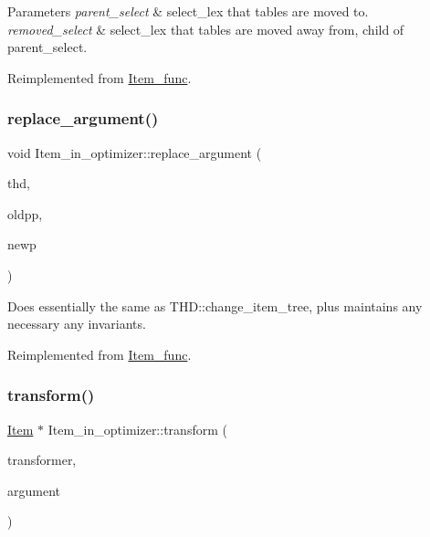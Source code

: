 \begin{DoxyParams}{Parameters}
{\em parent\+\_\+select} & select\+\_\+lex that tables are moved to. \\
\hline
{\em removed\+\_\+select} & select\+\_\+lex that tables are moved away from, child of parent\+\_\+select. \\
\hline
\end{DoxyParams}


Reimplemented from \mbox{\hyperlink{classItem__func_ab2b8cc7a3bf580679718da7e99e3e8d9}{Item\+\_\+func}}.

\mbox{\label{classItem__in__optimizer_a84811ad5fbb554956debfc5acf07faa7}} 
\subsubsection{\texorpdfstring{replace\+\_\+argument()}{replace\_argument()}}
{\footnotesize\ttfamily void Item\+\_\+in\+\_\+optimizer\+::replace\+\_\+argument (\begin{DoxyParamCaption}\item[{T\+HD $\ast$}]{thd,  }\item[{\mbox{\hyperlink{classItem}{Item}} $\ast$$\ast$}]{oldpp,  }\item[{\mbox{\hyperlink{classItem}{Item}} $\ast$}]{newp }\end{DoxyParamCaption})\hspace{0.3cm}{\ttfamily [virtual]}}

Does essentially the same as T\+H\+D\+::change\+\_\+item\+\_\+tree, plus maintains any necessary any invariants. 

Reimplemented from \mbox{\hyperlink{classItem__func_a057cee4e4645ad681094796d24236b62}{Item\+\_\+func}}.

\mbox{\label{classItem__in__optimizer_abf3e3561b7ff2f5e6d58a343cc93fcc5}} 
\subsubsection{\texorpdfstring{transform()}{transform()}}
{\footnotesize\ttfamily \mbox{\hyperlink{classItem}{Item}} $\ast$ Item\+\_\+in\+\_\+optimizer\+::transform (\begin{DoxyParamCaption}\item[{Item\+\_\+transformer}]{transformer,  }\item[{uchar $\ast$}]{argument }\end{DoxyParamCaption})\hspace{0.3cm}{\ttfamily [virtual]}}

